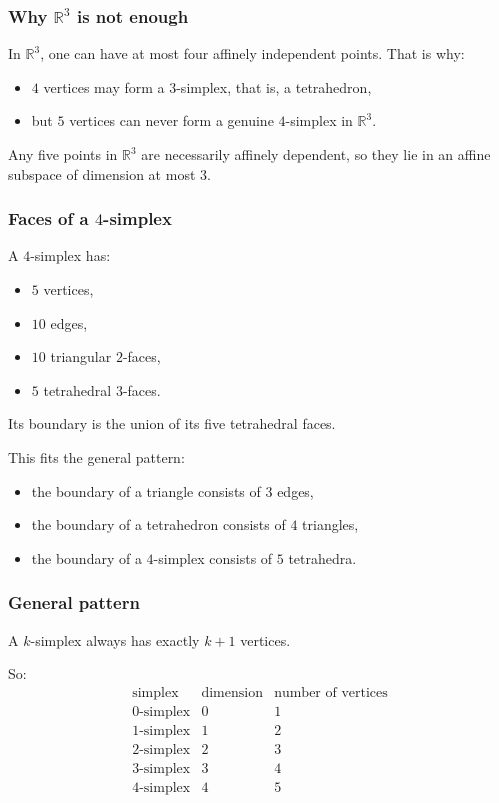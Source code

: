\documentclass[12pt,a4paper]{article}
\theoremstyle{notespace}
\begin{document}
\subsubsection{Why \(\mathbb{R}^3\) is not enough}

In \(\mathbb{R}^3\), one can have at most four affinely independent points. That is why:
\begin{itemize}
	\item \(4\) vertices may form a \(3\)-simplex, that is, a tetrahedron,
	\item but \(5\) vertices can never form a genuine \(4\)-simplex in \(\mathbb{R}^3\).
\end{itemize}

Any five points in \(\mathbb{R}^3\) are necessarily affinely dependent, so they lie in an affine subspace of dimension at most \(3\).

\subsubsection{Faces of a \(4\)-simplex}

A \(4\)-simplex has:
\begin{itemize}
	\item \(5\) vertices,
	\item \(10\) edges,
	\item \(10\) triangular \(2\)-faces,
	\item \(5\) tetrahedral \(3\)-faces.
\end{itemize}

Its boundary is the union of its five tetrahedral faces.

This fits the general pattern:
\begin{itemize}
	\item the boundary of a triangle consists of \(3\) edges,
	\item the boundary of a tetrahedron consists of \(4\) triangles,
	\item the boundary of a \(4\)-simplex consists of \(5\) tetrahedra.
\end{itemize}

\subsubsection{General pattern}

A \(k\)-simplex always has exactly \(k+1\) vertices.

So:
\[
\begin{array}{c|c|c}
	\text{simplex} & \text{dimension} & \text{number of vertices} \\ \hline
	0\text{-simplex} & 0 & 1 \\
	1\text{-simplex} & 1 & 2 \\
	2\text{-simplex} & 2 & 3 \\
	3\text{-simplex} & 3 & 4 \\
	4\text{-simplex} & 4 & 5
\end{array}
\]
\end{document}
